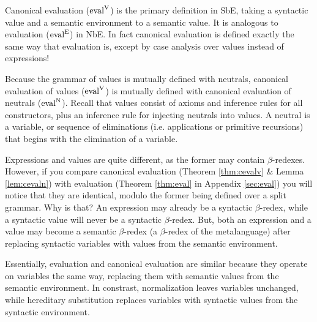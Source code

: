 \documentclass{llncs}
\newcommand{\refthm}[1]{Theorem \ref{thm:#1}}
\newcommand{\reflem}[1]{Lemma \ref{lem:#1}}
\newcommand{\refapp}[1]{Appendix \ref{sec:#1}}
\def\eval{\fun{eval}^\con{E}}
\def\cevalv{\fun{eval}^\con{V}}
\def\cevaln{\fun{eval}^\con{N}}
\newcommand{\con}[1]{\textmd{#1}}
\newcommand{\fun}[1]{\textmd{#1}}
\begin{document}
Canonical evaluation ($\cevalv$) is the primary definition in SbE, taking a
syntactic value and a semantic environment to a semantic value. It is
analogous to evaluation ($\eval$) in NbE. In fact canonical evaluation
is defined exactly the same way that evaluation is, except by case
analysis over values instead of expressions!

Because the grammar of values is mutually defined with neutrals,
canonical evaluation of values ($\cevalv$) is mutually defined with canonical
evaluation of neutrals ($\cevaln$). Recall that values consist of axioms and
inference rules for all constructors, plus an inference rule for
injecting neutrals into values. A neutral is a variable, or 
sequence of eliminations (i.e. applications or primitive recursions)
that begins with the elimination of a variable.

Expressions and values are quite different, as the former
may contain $\beta$-redexes. However, if you compare
canonical evaluation (\refthm{cevalv} \& \reflem{cevaln}) with
evaluation (\refthm{eval} in \refapp{eval}) you will notice that they are identical,
modulo the former being defined over a split grammar. Why is that?
An expression may already be a syntactic $\beta$-redex, while a
syntactic value will never be a syntactic $\beta$-redex. But, both an
expression and a value may become a semantic $\beta$-redex (a
$\beta$-redex of the metalanguage) after replacing syntactic variables
with values from the semantic environment. 

Essentially, evaluation and canonical evaluation are similar because
they operate on variables the same way, replacing them with semantic
values from the semantic environment. In constrast,
normalization leaves variables unchanged, while hereditary
substitution replaces variables with syntactic values from the
syntactic environment. 
\end{document}
